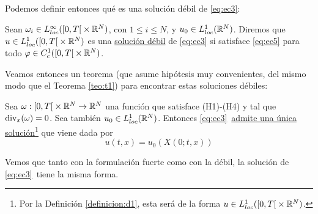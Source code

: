Podemos definir entonces qué es una solución débil de \eqref{eq:ec3}:

\begin{definicion}\label{definicion:d1}
    Sean $\omega_i \in L_{loc}^{\infty}(\left[0,T \right[ \times \mathbb{R}^N)$, con $1 \leq i \leq N$, y $u_0 \in L_{loc}^{1}(\mathbb{R}^N)$.
    Diremos que $u \in L^1_{loc}(\left[0,T \right[ \times \mathbb{R}^N)$ es una \underline{solución débil} de \eqref{eq:ec3} si satisface \eqref{eq:ec5} para todo 
    $\varphi \in C_c^1(\left[0,T \right[ \times \mathbb{R}^N)$.
\end{definicion}

Veamos entonces un teorema (que asume hipótesis muy convenientes, del mismo modo que el Teorema \ref{teo:t1}) para encontrar estas soluciones débiles:

\begin{teo}
    Sea $\omega : \left[0,T \right[ \times \mathbb{R}^N \to \mathbb{R}^N$ una función que satisface (H1)-(H4) y tal que $\text{div}_x(\omega) = 0$. Sea también $u_0 \in L_{loc}^{1}(\mathbb{R}^N)$.
    Entonces \eqref{eq:ec3}~\underline{admite una única solución}\footnote{Por la Definición \ref{definicion:d1}, esta será de la forma $u \in L^1_{loc}(\left[0,T \right[ \times \mathbb{R}^N)$.} que 
    viene dada por 
    $$\boxed{u(t,x) = u_0(X(0;t,x))}$$ 
\end{teo}

\begin{observacion}
    Vemos que tanto con la formulación fuerte como con la débil, la solución de \eqref{eq:ec3}~tiene la misma forma.
\end{observacion}

